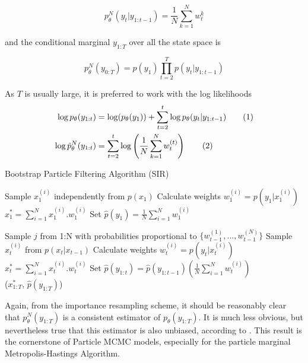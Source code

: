 \documentclass[11pt,a4,twosided,singlespacing,titlepagenumber=on]{scrreprt}
\numberwithin{equation}{chapter} %
\theoremstyle{remark}
\newcommand\numberthis{\addtocounter{equation}{1}\tag{\theequation}}
\begin{document}
\begin{equation}
 p^N_{\theta}(y_t | y_{1:t-1}) = \frac{1}{N} \sum_{k=1}^N w_t^k
\end{equation}


and the conditional marginal $y_{1:T}$ over all the state space is

\begin{equation}
 p^N_{\theta}(y_{0:T}) = p(y_1)\prod_{t=2}^T p(y_t | y_{1:t-1})
\end{equation}

As $T$ is usually large, it is preferred to work with the log likelihoods
\begin{align*}
\log p_{\theta}(y_{1:t}) &= \log(p_\theta(y_1)) + \sum_{t=2}^t \log p_\theta(y_t | y_{1:t-1}) \numberthis \\
\log \hat{p}^N_{\theta}(y_{1:t}) &= \sum_{t=2}^t \log \left(\frac{1}{N} \sum_{k=1}^N w_t^{(t)} \right) \numberthis
\end{align*}

\begin{algorithm}
\caption{Bootstrap Particle Filtering Algorithm (SIR)}\label{euclid}
\begin{algorithmic}[1]
	\State Sample $x_1^{(i)}$ independently from $p(x_1)$
	\State Calculate weights $w_1^{(i)} = p(y_1 | x_1^{(i)})$
\State $x^*_1 = \sum_{i=1}^N x_1^{(i)}.w_1^{(i)}$
\State Set $\hat{p}(y_1) = \frac{1}{N} \sum_{i=1}^N w_1^{(i)}$

		\State Sample $j$ from 1:N with probabilities proportional to $\{w_{t-1}^{(1)},..., w_{t-1}^{(N)}\}$
		\State Sample $x_t^{(i)}$ from $p(x_t|x_{t-1})$
		\State Calculate weights $w_t^{(i)} = p(y_t|x_t^{(i)})$
	\State $x^*_t = \sum_{i=1}^N x_t^{(i)}.w_t^{(i)}$
	\State Set $\hat{p}(y_{1:t}) = \hat{p}(y_{1:t-1}) \left(\frac{1}{N} \sum_{i=1}^N w_t^{(i)} \right)$
\\
\Return ($x^*_{1:T}$, $\hat{p}(y_{1:T})$)
\EndProcedure
\end{algorithmic}
\end{algorithm}


Again, from the importance resampling scheme, it should be reasonably clear that $p^N_{\theta}(y_{1:T})$ is a consistent estimator of $p_{\theta}(y_{1:T})$. It is much less obvious, but nevertheless true that this estimator is also unbiased, according to \cite{delmoral2004}. This result is the cornerstone of Particle MCMC models, especially for the particle marginal Metropolis-Hastings Algorithm.
\end{document}
